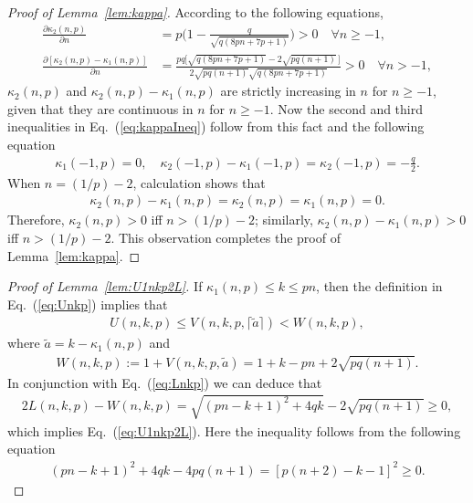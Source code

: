 \documentclass[aop]{imsart}
\theoremstyle{plain}
\theoremstyle{remark}
\newcommand{\1}{\operatorname{\uppercase\expandafter{\romannumeral1}}}
\newcommand{\2}{\operatorname{\uppercase\expandafter{\romannumeral2}}}
\newcommand{\3}{\operatorname{\uppercase\expandafter{\romannumeral3}}}
\newcommand{\4}{\operatorname{\uppercase\expandafter{\romannumeral4}}}
\newcommand{\5}{\operatorname{\uppercase\expandafter{\romannumeral5}}}
\newcommand{\6}{\operatorname{\uppercase\expandafter{\romannumeral6}}}
\newcommand{\7}{\operatorname{\uppercase\expandafter{\romannumeral7}}}
\newcommand{\8}{\operatorname{\uppercase\expandafter{\romannumeral8}}}
\newcommand{\9}{\operatorname{\uppercase\expandafter{\romannumeral9}}}
\newcommand{\eref}[1]{Eq.~\textup{(\ref{#1})}}
\newcommand{\lref}[1]{Lemma~\ref{#1}}
\begin{document}
\begin{appendix}
\begin{proof}[Proof of \lref{lem:kappa}]
	
	
	According to the following equations,
	\begin{align}
	\frac{\partial \kappa_2(n,p)}{\partial n}&=p\biggl(1-\frac{q}{\sqrt{q(8p n+7p+1)}}\biggr)>0\quad \forall   n\geq -1,\\
	\frac{\partial [\kappa_2(n,p)-\kappa_1(n,p)]}{\partial n}&=\frac{p q \bigl[\sqrt{q(8p n+7p+1)}-2\sqrt{p q(n+1)}\,\bigr]}{2\sqrt{p q(n+1)}\sqrt{q(8p n+7p+1)}}>0\quad \forall  n>-1,
	\end{align}
	$\kappa_2(n,p)$ and $\kappa_2(n,p)-\kappa_1(n,p)$ are strictly increasing in $n$ for $n\geq -1$, given that they are continuous in $n$ for $n\geq -1$. Now the second and third inequalities in   \eref{eq:kappaIneq} follow from this fact and the following equation
	\begin{align}
	\kappa_1(-1,p)=0,\quad \kappa_2(-1,p)-\kappa_1(-1,p)=\kappa_2(-1,p)=-\frac{q}{2}.
	\end{align}
	When  $n= (1/p)-2$, calculation shows that 
	\begin{align}
	\kappa_2(n,p)- \kappa_1(n,p)=\kappa_2(n,p)= \kappa_1(n,p)=0. 
	\end{align}
	Therefore,  $\kappa_2(n,p)> 0$ iff $n> (1/p)-2$; similarly, $\kappa_2(n,p)-\kappa_1(n,p)> 0$ iff $n> (1/p)-2$. 	 This observation completes the proof of \lref{lem:kappa}. 
\end{proof}

\begin{proof}[Proof of \lref{lem:U1nkp2L}]
	If $\kappa_1(n,p)\leq k\leq pn$, then the definition in \eref{eq:Unkp} implies that
	\begin{align}
	U(n,k,p)\leq V(n,k,p,\lceil\tilde{a}\rceil )< W(n,k,p),
	\end{align}
	where $\tilde{a}=k-\kappa_1(n,p)$ and 
	\begin{align}
	W(n,k,p):= 1+V(n,k,p,\tilde{a} )=1+k-p n+2\sqrt{p q(n+1)}. 
	\end{align}
	In conjunction with  \eref{eq:Lnkp} we can deduce that
	\begin{align}
	2L(n,k,p)- W(n,k,p)=\sqrt{(p n-k+1)^2+4q k}-2\sqrt{p q(n+1)}\geq 0,
	\end{align}
	which implies \eref{eq:U1nkp2L}. 
	Here the inequality follows from the following equation
	\begin{align}
	(p n-k+1)^2+4q k-4 p q(n+1)=[p(n+2)-k-1]^2\geq 0.
	\end{align}	
	

\end{proof}
\end{appendix}
\end{document}
